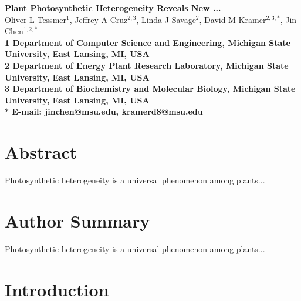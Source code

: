 \pagestyle{myheadings}







\begin{flushleft}
{\Large
\textbf{Plant Photosynthetic Heterogeneity Reveals New ...}
}
\\
Oliver L Tessmer$^{1}$,
Jeffrey A Cruz$^{2,3}$,
Linda J Savage$^{2}$,
David M Kramer$^{2,3,\ast}$,
Jin Chen$^{1,2,\ast}$
\\
\bf{1} Department of Computer Science and Engineering, Michigan State University, East Lansing, MI, USA
\\
\bf{2} Department of Energy Plant Research Laboratory, Michigan State University, East Lansing, MI, USA
\\
\bf{3} Department of Biochemistry and Molecular Biology, Michigan State University, East Lansing, MI, USA
\\
$\ast$ E-mail: jinchen@msu.edu, kramerd8@msu.edu
\end{flushleft}

\section*{Abstract}

Photosynthetic heterogeneity is a universal phenomenon among plants...

\section*{Author Summary}

Photosynthetic heterogeneity is a universal phenomenon among plants...

\section*{Introduction}


